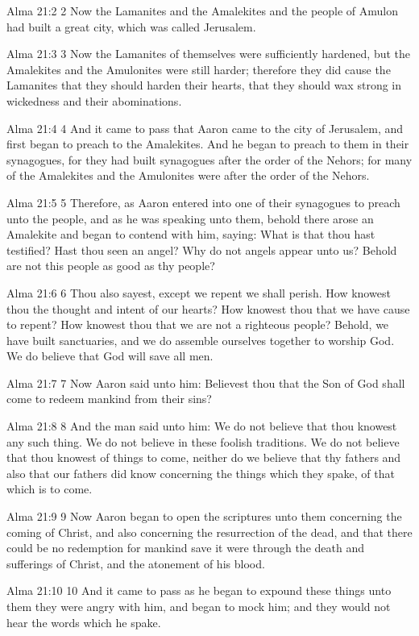 Alma 21:2
 2 Now the Lamanites and the Amalekites and the people of Amulon
had built a great city, which was called Jerusalem.

Alma 21:3
 3 Now the Lamanites of themselves were sufficiently hardened,
but the Amalekites and the Amulonites were still harder;
therefore they did cause the Lamanites that they should harden
their hearts, that they should wax strong in wickedness and their
abominations.

Alma 21:4
 4 And it came to pass that Aaron came to the city of Jerusalem,
and first began to preach to the Amalekites. And he began to
preach to them in their synagogues, for they had built synagogues
after the order of the Nehors; for many of the Amalekites and the
Amulonites were after the order of the Nehors.

Alma 21:5
 5 Therefore, as Aaron entered into one of their synagogues to
preach unto the people, and as he was speaking unto them, behold
there arose an Amalekite and began to contend with him, saying:
What is that thou hast testified? Hast thou seen an angel? Why
do not angels appear unto us? Behold are not this people as good
as thy people?

Alma 21:6
 6 Thou also sayest, except we repent we shall perish. How
knowest thou the thought and intent of our hearts? How knowest
thou that we have cause to repent? How knowest thou that we are
not a righteous people? Behold, we have built sanctuaries, and
we do assemble ourselves together to worship God. We do believe
that God will save all men.

Alma 21:7
 7 Now Aaron said unto him: Believest thou that the Son of God
shall come to redeem mankind from their sins?

Alma 21:8
 8 And the man said unto him: We do not believe that thou knowest
any such thing. We do not believe in these foolish traditions.
We do not believe that thou knowest of things to come, neither do
we believe that thy fathers and also that our fathers did know
concerning the things which they spake, of that which is to come.

Alma 21:9
 9 Now Aaron began to open the scriptures unto them concerning
the coming of Christ, and also concerning the resurrection of the
dead, and that there could be no redemption for mankind save it
were through the death and sufferings of Christ, and the
atonement of his blood.

Alma 21:10
 10 And it came to pass as he began to expound these things unto
them they were angry with him, and began to mock him; and they
would not hear the words which he spake.

